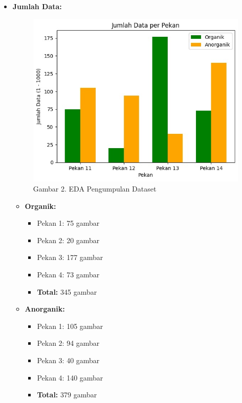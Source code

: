 \documentclass[12pt,a4paper]{article}
\begin{document}
\begin{itemize}

    \item \textbf{Jumlah Data:}
         \begin{figure}[h]
        \centering
        \includegraphics[width=0.6\linewidth]{Images/jumlahdataset.jpeg}
        \caption*{Gambar 2. EDA Pengumpulan Dataset}
        \label{fig:dataset_collection}
    \end{figure}
    \begin{itemize}
        \item \textbf{Organik:} 
        \begin{itemize}
            \item Pekan 1: 75 gambar
            \item Pekan 2: 20 gambar
            \item Pekan 3: 177 gambar
            \item Pekan 4: 73 gambar
            \item \textbf{Total:} 345 gambar
        \end{itemize}
        \item \textbf{Anorganik:}
        \begin{itemize}
            \item Pekan 1: 105 gambar
            \item Pekan 2: 94 gambar
            \item Pekan 3: 40 gambar
            \item Pekan 4: 140 gambar
            \item \textbf{Total:} 379 gambar
        \end{itemize}
    
    \end{itemize}


\end{itemize}
\end{document}
